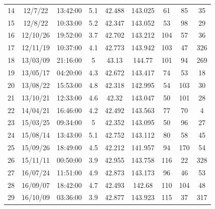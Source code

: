 \begin{table}[!ht]
{\begin{tabular}{@{}ccccccccc@{}}
      14 & 12/7/22         & 13:42:00        & 5.1   & 42.488       & 143.025       & 61         & 85            & 35          \\
      15 & 12/8/22         & 10:33:00        & 5.2   & 42.347       & 143.052       & 53         & 98            & 29          \\
      16 & 12/10/26        & 19:52:00        & 3.7   & 42.702       & 143.212       & 104        & 57            & 36          \\
      17 & 12/11/19        & 10:37:00        & 4.1   & 42.773       & 143.942       & 103        & 47            & 326         \\
      18 & 13/03/09        & 21:16:00        & 5     & 43.13        & 144.77        & 101        & 94            & 269         \\
      19 & 13/05/17        & 04:20:00        & 4.3   & 42.672       & 143.417       & 74         & 53            & 18          \\
      20 & 13/08/22        & 15:53:00        & 4.8   & 42.318       & 142.995       & 54         & 103           & 30          \\
      21 & 13/10/21        & 12:33:00        & 4.6   & 42.32        & 143.047       & 50         & 101           & 28          \\
      22 & 14/04/21        & 16:46:00        & 4.2   & 42.492       & 143.563       & 77         & 70            & 4           \\
      23 & 15/03/25        & 09:34:00        & 5     & 42.352       & 143.095       & 50         & 96            & 27          \\
      24 & 15/08/14        & 13:43:00        & 5.1   & 42.752       & 143.112       & 80         & 58            & 45          \\
      25 & 15/09/26        & 18:49:00        & 4.5   & 42.212       & 141.957       & 94         & 170           & 54          \\
      26 & 15/11/11        & 00:50:00        & 3.9   & 42.955       & 143.758       & 116        & 22            & 328         \\
      27 & 16/07/24        & 11:51:00        & 4.9   & 42.873       & 143.173       & 96         & 46            & 53          \\
      28 & 16/09/07        & 18:42:00        & 4.7   & 42.493       & 142.68        & 110        & 104           & 48          \\
      29 & 16/10/09        & 03:36:00        & 3.9   & 42.877       & 143.923       & 115        & 37            & 317         \\

\end{tabular}}
\end{table}
